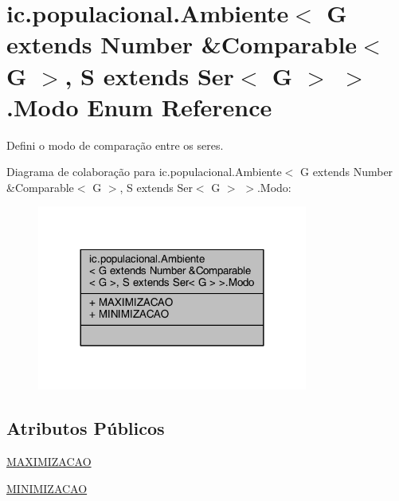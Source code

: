 \hypertarget{enumic_1_1populacional_1_1_ambiente_3_01_g_01extends_01_number_01_6_comparable_3_01_g_01_4_00_0156fb2ffb0f78f5b655aaee5b0df471a7}{\section{ic.\-populacional.\-Ambiente$<$ G extends Number \&Comparable$<$ G $>$, S extends Ser$<$ G $>$ $>$.Modo Enum Reference}
\label{enumic_1_1populacional_1_1_ambiente_3_01_g_01extends_01_number_01_6_comparable_3_01_g_01_4_00_0156fb2ffb0f78f5b655aaee5b0df471a7}
}


Defini o modo de comparação entre os seres.  




Diagrama de colaboração para ic.\-populacional.\-Ambiente$<$ G extends Number \&Comparable$<$ G $>$, S extends Ser$<$ G $>$ $>$.Modo\-:
\nopagebreak
\begin{figure}[H]
\begin{center}
\leavevmode
\includegraphics[width=252pt]{enumic_1_1populacional_1_1_ambiente_3_01_g_01extends_01_number_01_6_comparable_3_01_g_01_4_00_013449bdab33fd736a81c080f8d267e888}
\end{center}
\end{figure}
\subsection*{Atributos Públicos}
\begin{DoxyCompactItemize}
\item 
\hyperlink{enumic_1_1populacional_1_1_ambiente_3_01_g_01extends_01_number_01_6_comparable_3_01_g_01_4_00_0156fb2ffb0f78f5b655aaee5b0df471a7_aebd926ba90a2f0976426930757e52389}{M\-A\-X\-I\-M\-I\-Z\-A\-C\-A\-O}
\item 
\hyperlink{enumic_1_1populacional_1_1_ambiente_3_01_g_01extends_01_number_01_6_comparable_3_01_g_01_4_00_0156fb2ffb0f78f5b655aaee5b0df471a7_a78ac05db732c05991ffbc586141bd137}{M\-I\-N\-I\-M\-I\-Z\-A\-C\-A\-O}
\end{DoxyCompactItemize}


